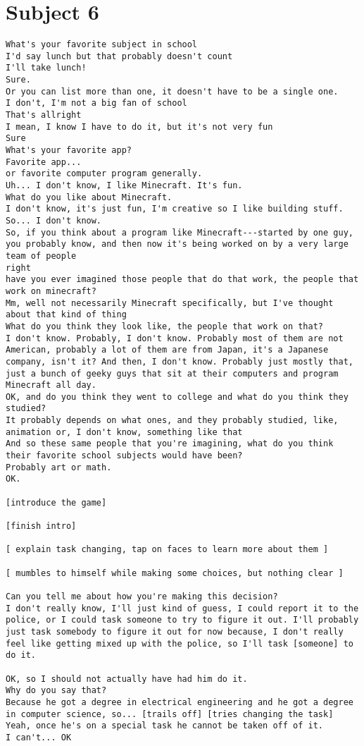 \clearpage\section*{Subject 6}
\begin{lstlisting}
What's your favorite subject in school
I'd say lunch but that probably doesn't count
I'll take lunch!
Sure.
Or you can list more than one, it doesn't have to be a single one.
I don't, I'm not a big fan of school
That's allright
I mean, I know I have to do it, but it's not very fun
Sure
What's your favorite app?
Favorite app...
or favorite computer program generally.
Uh... I don't know, I like Minecraft. It's fun.
What do you like about Minecraft.
I don't know, it's just fun, I'm creative so I like building stuff. So... I don't know.
So, if you think about a program like Minecraft---started by one guy, you probably know, and then now it's being worked on by a very large team of people
right
have you ever imagined those people that do that work, the people that work on minecraft?
Mm, well not necessarily Minecraft specifically, but I've thought about that kind of thing
What do you think they look like, the people that work on that?
I don't know. Probably, I don't know. Probably most of them are not American, probably a lot of them are from Japan, it's a Japanese company, isn't it? And then, I don't know. Probably just mostly that, just a bunch of geeky guys that sit at their computers and program Minecraft all day.
OK, and do you think they went to college and what do you think they studied?
It probably depends on what ones, and they probably studied, like, animation or, I don't know, something like that
And so these same people that you're imagining, what do you think their favorite school subjects would have been?
Probably art or math.
OK.

[introduce the game]

[finish intro]

[ explain task changing, tap on faces to learn more about them ]

[ mumbles to himself while making some choices, but nothing clear ]

Can you tell me about how you're making this decision?
I don't really know, I'll just kind of guess, I could report it to the police, or I could task someone to try to figure it out. I'll probably just task somebody to figure it out for now because, I don't really feel like getting mixed up with the police, so I'll task [someone] to do it.

OK, so I should not actually have had him do it.
Why do you say that?
Because he got a degree in electrical engineering and he got a degree in computer science, so... [trails off] [tries changing the task]
Yeah, once he's on a special task he cannot be taken off of it.
I can't... OK


\end{lstlisting}
